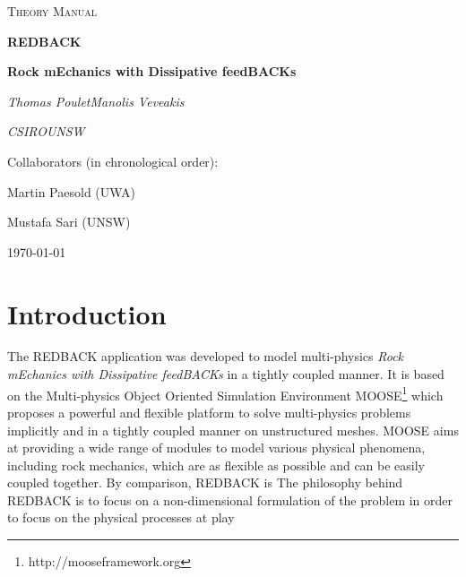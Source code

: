 \documentclass[]{scrreprt}
\newcommand{\moose}{{MOOSE}}
\newcommand{\redback}{{REDBACK}}
\begin{document}
\begin{titlepage}
	\centering
	{\scshape\LARGE Theory Manual \par}
	\vspace{1cm}
	\vspace{1.5cm}
	{\Huge\bfseries \redback{} \par}
	\vspace{0.5cm}
	{\large\bfseries Rock mEchanics with Dissipative feedBACKs\par}
	\vspace{2cm}
	{\Large\itshape Thomas Poulet\hspace{2cm}Manolis Veveakis\par}
	\vspace{0.5cm}
	{\Large\itshape CSIRO\hspace{4cm}UNSW\par}
	\vfill
	Collaborators (in chronological order):\par
	Martin Paesold (UWA) \par
	Mustafa Sari (UNSW)

	\vfill

	{\large \today\par}
\end{titlepage}

%	

\tableofcontents

\chapter{Introduction}

The \redback{} application was developed to model multi-physics \textit{Rock mEchanics with
Dissipative feedBACKs} in a tightly coupled manner. It is based on the Multi-physics Object Oriented Simulation Environment \moose{}\footnote{http://mooseframework.org} \citep{Gaston2009} which proposes a powerful and flexible platform to solve multi-physics problems implicitly and in a tightly coupled manner on unstructured meshes. \moose{} aims at providing a wide range of modules to model various physical phenomena, including rock mechanics, which are as flexible as possible and can be easily coupled together. By comparison, \redback{} is  
The philosophy behind \redback{} is to focus on a non-dimensional formulation of the problem in order to focus on the physical processes at play
\end{document}
